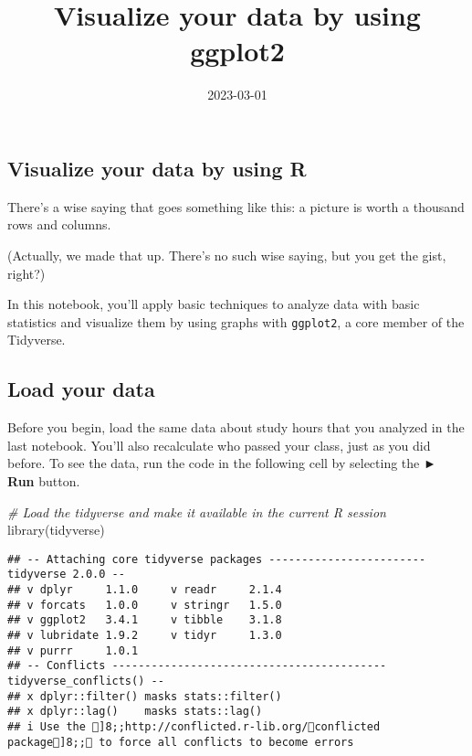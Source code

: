 \documentclass[
]{article}
\title{Visualize your data by using ggplot2}
\author{}
\date{\vspace{-2.5em}2023-03-01}
\newenvironment{Shaded}{\begin{snugshade}}{\end{snugshade}}
\newcommand{\CommentTok}[1]{\textcolor[rgb]{0.56,0.35,0.01}{\textit{#1}}}
\newcommand{\FunctionTok}[1]{\textcolor[rgb]{0.00,0.00,0.00}{#1}}
\newcommand{\NormalTok}[1]{#1}
\begin{document}
\maketitle

\hypertarget{visualize-your-data-by-using-r}{%
\subsection{Visualize your data by using
R}\label{visualize-your-data-by-using-r}}

There's a wise saying that goes something like this: a picture is worth
a thousand rows and columns.

(Actually, we made that up. There's no such wise saying, but you get the
gist, right?)

In this notebook, you'll apply basic techniques to analyze data with
basic statistics and visualize them by using graphs with
\texttt{ggplot2}, a core member of the Tidyverse.

\hypertarget{load-your-data}{%
\subsection{Load your data}\label{load-your-data}}

Before you begin, load the same data about study hours that you analyzed
in the last notebook. You'll also recalculate who passed your class,
just as you did before. To see the data, run the code in the following
cell by selecting the \textbf{► Run} button.

\begin{Shaded}
\begin{Highlighting}[]
\CommentTok{\# Load the tidyverse and make it available in the current R session}
\FunctionTok{library}\NormalTok{(tidyverse)}
\end{Highlighting}
\end{Shaded}

\begin{verbatim}
## -- Attaching core tidyverse packages ------------------------ tidyverse 2.0.0 --
## v dplyr     1.1.0     v readr     2.1.4
## v forcats   1.0.0     v stringr   1.5.0
## v ggplot2   3.4.1     v tibble    3.1.8
## v lubridate 1.9.2     v tidyr     1.3.0
## v purrr     1.0.1     
## -- Conflicts ------------------------------------------ tidyverse_conflicts() --
## x dplyr::filter() masks stats::filter()
## x dplyr::lag()    masks stats::lag()
## i Use the ]8;;http://conflicted.r-lib.org/conflicted package]8;; to force all conflicts to become errors
\end{verbatim}
\end{document}
